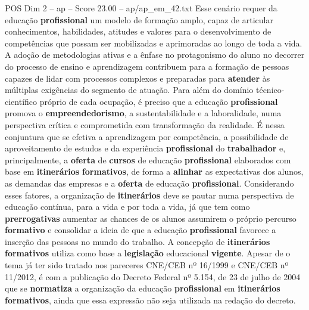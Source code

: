 \begin{textsample}{POS Dim 2 – ap – Score 23.00 – ap/ap\_em\_42.txt}
Esse cenário requer da educação \textbf{profissional} um modelo de formação amplo, capaz de articular conhecimentos, habilidades, atitudes e valores para o desenvolvimento de competências que possam ser mobilizadas e aprimoradas ao longo de toda a vida.
A adoção de metodologias ativas e a ênfase no protagonismo do aluno no decorrer do processo de ensino e aprendizagem contribuem para a formação de pessoas capazes de lidar com processos complexos e preparadas para \textbf{atender} às múltiplas exigências do segmento de atuação.
Para além do domínio técnico-científico próprio de cada ocupação, é preciso que a educação \textbf{profissional} promova o \textbf{empreendedorismo}, a sustentabilidade e a laboralidade, numa perspectiva crítica e comprometida com transformação da realidade.
É nessa conjuntura que se efetiva a aprendizagem por competência, a possibilidade de aproveitamento de estudos e da experiência \textbf{profissional} do \textbf{trabalhador} e, principalmente, a \textbf{oferta} de \textbf{cursos} de educação \textbf{profissional} elaborados com base em \textbf{itinerários} \textbf{formativos}, de forma a \textbf{alinhar} as expectativas dos alunos, as demandas das empresas e a \textbf{oferta} de educação \textbf{profissional}.
Considerando esses fatores, a organização de \textbf{itinerários} deve se pautar numa perspectiva de educação contínua, para a vida e por toda a vida, já que tem como \textbf{prerrogativas} aumentar as chances de os alunos assumirem o próprio percurso \textbf{formativo} e consolidar a ideia de que a educação \textbf{profissional} favorece a inserção das pessoas no mundo do trabalho.
A concepção de \textbf{itinerários} \textbf{formativos} utiliza como base a \textbf{legislação} educacional \textbf{vigente}.
Apesar de o tema já ter sido tratado nos pareceres CNE/CEB nº 16/1999 e CNE/CEB nº 11/2012, é com a publicação do Decreto Federal nº 5.154, de 23 de julho de 2004 que se \textbf{normatiza} a organização da educação \textbf{profissional} em \textbf{itinerários} \textbf{formativos}, ainda que essa expressão não seja utilizada na redação do decreto.

\end{textsample}
